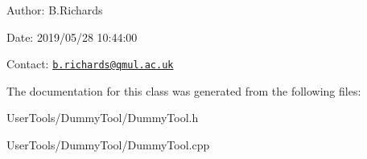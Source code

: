 \begin{DoxyParagraph}{Author\-:}
B.\-Richards 
\end{DoxyParagraph}
\begin{DoxyParagraph}{Date\-:}
2019/05/28 10\-:44\-:00 
\end{DoxyParagraph}
Contact\-: \href{mailto:b.richards@qmul.ac.uk}{\tt b.\-richards@qmul.\-ac.\-uk} 

The documentation for this class was generated from the following files\-:\begin{DoxyCompactItemize}
\item 
User\-Tools/\-Dummy\-Tool/Dummy\-Tool.\-h\item 
User\-Tools/\-Dummy\-Tool/Dummy\-Tool.\-cpp\end{DoxyCompactItemize}

